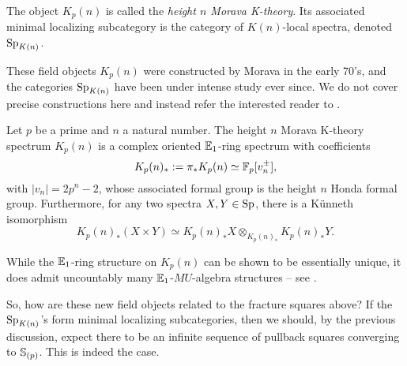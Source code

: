 \begin{notation}
    The object $K_p(n)$ is called the \emph{height $n$ Morava K-theory}. Its associated minimal localizing subcategory is the category of $K(n)$-local spectra, denoted $\SpK$.  
\end{notation}

These field objects $K_p(n)$ were constructed by Morava in the early 70's, and the categories $\SpK$ have been under intense study ever since. We do not cover precise constructions here and instead refer the interested reader to \cite{hovey-strickland_99}. 

\begin{proposition}
    \label{prop:properties-of-K(n)}
    Let $p$ be a prime and $n$ a natural number. The height $n$ Morava K-theory spectrum $K_p(n)$ is a complex oriented $\E_1$-ring spectrum with coefficients 
    $$K_p(n)_*:=\pi_* K_p(n) \simeq \F_p[v_n^{\pm}],$$ 
    with $|v_n|=2p^n-2$, whose associated formal group is the height $n$ Honda formal group. Furthermore, for any two spectra $X, Y\in \sp$, there is a Künneth isomorphism 
    $$K_p(n)_*(X\times Y)\simeq K_p(n)_*X\otimes_{K_p(n)_*} K_p(n)_*Y.$$
\end{proposition}

\begin{remark}
    While the $\E_1$-ring structure on $K_p(n)$ can be shown to be essentially unique, it does admit uncountably many $\E_1$-$MU$-algebra structures -- see \cite{angeltveit_2011}. 
\end{remark}

So, how are these new field objects related to the fracture squares above? If the $\SpK$'s form minimal localizing subcategories, then we should, by the previous discussion, expect there to be an infinite sequence of pullback squares converging to $\S_{(p)}$. This is indeed the case. 

